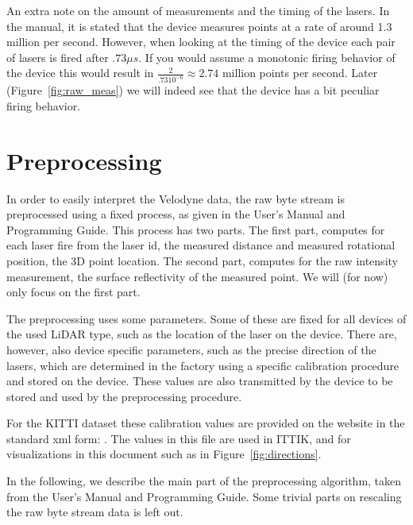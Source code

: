 \documentclass[english]{article}
\begin{document}
An extra note on the amount of measurements and the timing of the lasers. In the
manual, it is stated that the device measures points at a rate of around 1.3 million
per second. However, when looking at the timing of the device each pair of
lasers is fired after $.73 \mu s$. If you would assume a monotonic firing behavior
of the device this would result in $\frac{2}{.73 10^{-6}} \approx 2.74$ million
points per second. Later (Figure~\ref{fig:raw_meas}) we will indeed see that the
device has a bit peculiar firing behavior.

\section{Preprocessing}
\label{sec:preproc}
In order to easily interpret the Velodyne data, the raw byte stream is
preprocessed using a fixed process, as given in the User's Manual and
Programming Guide. This process has two parts. The first part, computes for
each laser fire from the laser id, the measured distance and measured
rotational position, the 3D point location. The second part, computes
for the raw intensity measurement, the surface reflectivity of the
measured point. We will (for now) only focus on the first part.

The preprocessing uses some parameters. Some of these are fixed for all
devices of the used LiDAR type, such as the location of the laser on the
device. There are, however, also device specific parameters, such as the
precise direction of the lasers, which are determined in the factory
using a specific calibration procedure and stored on the device. These
values are also transmitted by the device to be stored and used by the
preprocessing procedure.

For the KITTI dataset these calibration values are provided on the
website in the standard xml form:
. The values in
this file are used in ITTIK, and for visualizations in this document
such as in Figure~\ref{fig:directions}.

In the following, we describe the main part of the preprocessing
algorithm, taken from the User's Manual and Programming Guide. Some
trivial parts on rescaling the raw byte stream data is left out.
\end{document}
